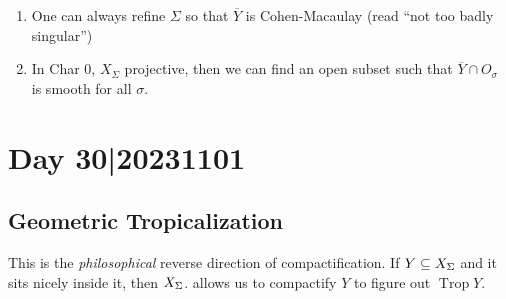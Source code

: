 \documentclass[12pt]{memoir}
\DeclareMathOperator{\Trop}{Trop}
\theoremstyle{definition}
\begin{document}
\begin{enumerate}
\item One can always refine $\Sigma$ so that $\overline{Y}$ is Cohen-Macaulay (read ``not too badly singular'')
\item In Char 0, $X_\Sigma$ projective, then we can find an open subset such that $\overline{Y} \cap O_\sigma$ is smooth for all $\sigma$.
\end{enumerate}





\section{Day 30|20231101}

\subsection{Geometric Tropicalization}

This is the \emph{philosophical} reverse direction of compactification. If $Y\subseteq X_\Sigma$ and it sits nicely inside it, then $X_\Sigma$. allows us to compactify $Y$ to figure out $\Trop Y$.
\end{document}
